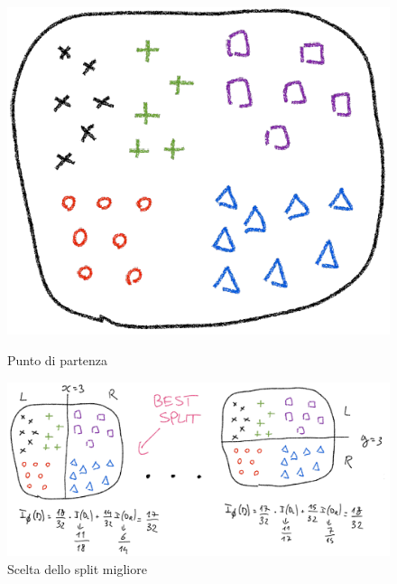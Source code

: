 \begin{figure}
	\centering
	\begin{minipage}{.4\textwidth}
		\centering
		\includegraphics[width=0.8\linewidth]{imgs/chapter5/img9}
		\caption{Punto di partenza}
		\label{fig:chapter05-09}
	\end{minipage}%
	\begin{minipage}{.6\textwidth}
		\centering
		\includegraphics[width=1\linewidth]{imgs/chapter5/img10}
		\caption{Scelta dello split migliore}
		\label{fig:chapter05-10}
	\end{minipage}
\end{figure}

